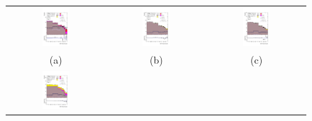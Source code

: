 \begin{figure}[H]
\begin{tabular}{@{}ccc@{}}
\includegraphics[width=0.3\textwidth]{figures/tuH_reg1l2tau1bnj_os.pdf}&
\includegraphics[width=0.3\textwidth]{figures/tuH_reg1l1tau1b1j_ss.pdf}&
\includegraphics[width=0.3\textwidth]{figures/tuH_reg1l1tau1b2j_ss.pdf}\\
(a)  & (b) & (c) \\
\includegraphics[width=0.3\textwidth]{figures/tuH_reg1l1tau1b2j_os.pdf}&

\end{tabular}
\end{figure}
